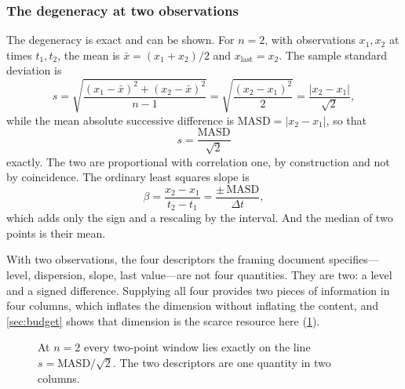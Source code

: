 \documentclass[12pt,a4paper,oneside]{report}
\begin{document}
\subsubsection{The degeneracy at two observations}

The degeneracy is exact and can be shown. For $n = 2$, with observations $x_1, x_2$ at times $t_1, t_2$, the mean is $\bar{x} = (x_1+x_2)/2$ and $x_{\text{last}} = x_2$. The sample standard deviation is
\begin{equation}
  s = \sqrt{\frac{(x_1-\bar x)^2 + (x_2-\bar x)^2}{n-1}}
    = \sqrt{\frac{(x_2-x_1)^2}{2}}
    = \frac{\lvert x_2 - x_1\rvert}{\sqrt{2}},
\end{equation}
while the mean absolute successive difference is $\mathrm{MASD} = \lvert x_2 - x_1 \rvert$, so that
\begin{equation}
  \boxed{\;s = \frac{\mathrm{MASD}}{\sqrt{2}}\;}
\end{equation}
exactly. The two are proportional with correlation one, by construction and not by coincidence. The ordinary least squares slope is
\begin{equation}
  \beta = \frac{x_2 - x_1}{t_2 - t_1} = \frac{\pm\,\mathrm{MASD}}{\Delta t},
\end{equation}
which adds only the sign and a rescaling by the interval. And the median of two points is their mean.

With two observations, the four descriptors the framing document specifies---level, dispersion, slope, last value---are not four quantities. They are two: a level and a signed difference. Supplying all four provides two pieces of information in four columns, which inflates the dimension without inflating the content, and \cref{sec:budget} shows that dimension is the scarce resource here (\cref{fig:degeneracy}).

\begin{figure}[htbp]
\centering
{}
\caption{At $n=2$ every two-point window lies exactly on the line $s = \mathrm{MASD}/\sqrt{2}$. The two descriptors are one quantity in two columns.}\label{fig:degeneracy}
\end{figure}
\end{document}
